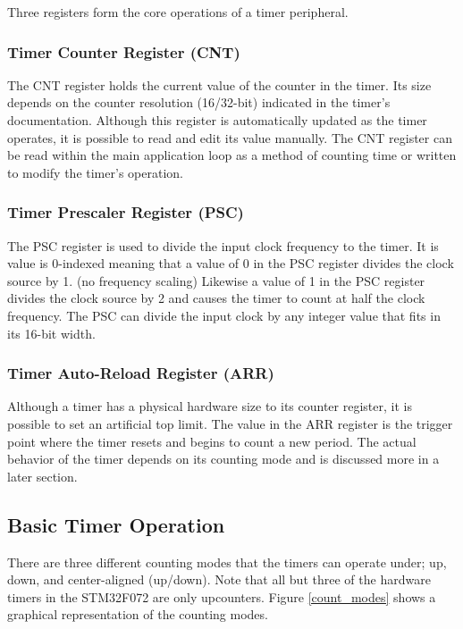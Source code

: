 \documentclass[11pt,fleqn]{book} %
\begin{document}
    Three registers form the core operations of a timer peripheral. 
    \subsubsection{Timer Counter Register (CNT)}
    The CNT register holds the current value of the counter in the timer. Its size depends on the counter resolution (16/32-bit) indicated in the timer's documentation. Although this register is automatically updated as the timer operates, it is possible to read and edit its value manually. The CNT register can be read within the main application loop as a method of counting time or written to modify the timer's operation. 
    \subsubsection{Timer Prescaler Register (PSC)}
    The PSC register is used to divide the input clock frequency to the timer. It is value is 0-indexed meaning that a value of 0 in the PSC register divides the clock source by 1. (no frequency scaling) Likewise a value of 1 in the PSC register divides the clock source by 2 and causes the timer to count at half the clock frequency. The PSC can divide the input clock by any integer value that fits in its 16-bit width.  
    \subsubsection{Timer Auto-Reload Register (ARR)}
     Although a timer has a physical hardware size to its counter register, it is possible to set an artificial top limit. The value in the ARR register is the trigger point where the timer resets and begins to count a new period. The actual behavior of the timer depends on its counting mode and is discussed more in a later section. 

    
    \subsection{Basic Timer Operation}
    
    There are three different counting modes that the timers can operate under; up, down, and center-aligned (up/down). Note that all but three of the hardware timers in the STM32F072 are only upcounters. Figure \ref{count_modes} shows a graphical representation of the counting modes.  
    
\end{document}
